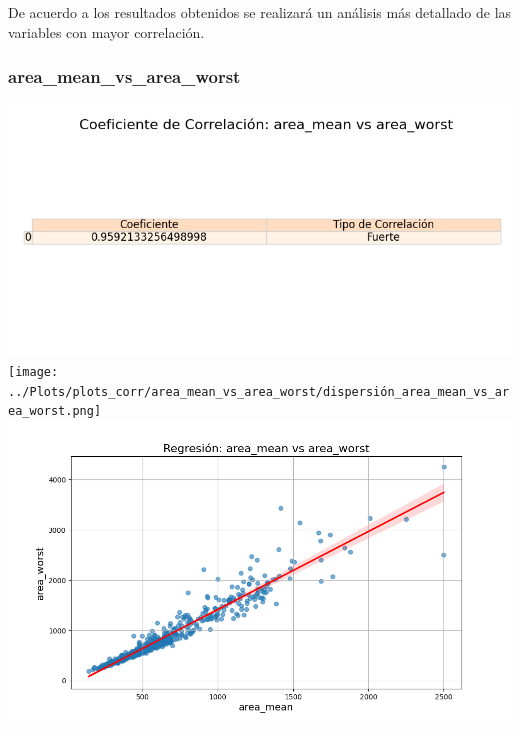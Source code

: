 \documentclass[a4paper, 12pt]{article}
\begin{document}
	De acuerdo a los resultados obtenidos se realizará un análisis más detallado de las variables con mayor correlación.

\subsubsection{area\_mean\_vs\_area\_worst}
	\includegraphics[width = \textwidth]{../Plots/plots_corr/area_mean_vs_area_worst/coeficiente_correlacion_area_mean_vs_area_worst.png}
	\texttt{[image: ../Plots/plots\_corr/area\_mean\_vs\_area\_worst/dispersión\_area\_mean\_vs\_area\_worst.png]}
	\includegraphics[width = \textwidth]{../Plots/plots_corr/area_mean_vs_area_worst/regresion_area_mean_vs_area_worst.png}
\end{document}
